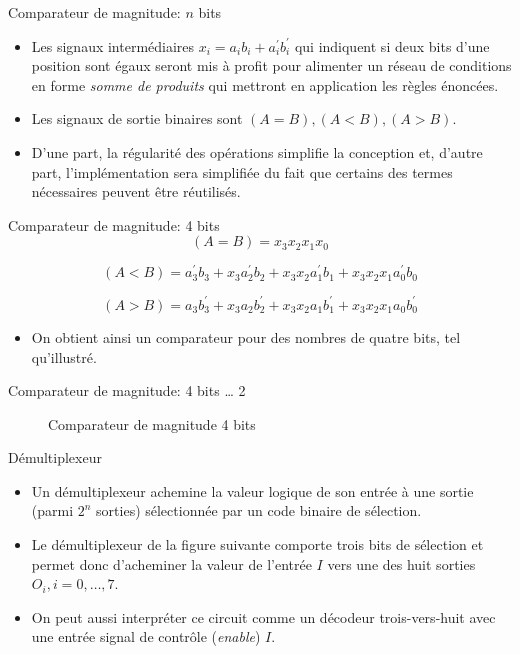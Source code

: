 \documentclass[presentation]{beamer}
\begin{document}
\begin{frame}[label={sec:org6680f65}]{Comparateur de magnitude: \(n\) bits}
\begin{itemize}
\item Les signaux intermédiaires \(x_i = a_i b_i + a_i^\prime b_i^\prime\) qui indiquent si deux bits d'une position sont égaux seront mis à profit pour alimenter un réseau de conditions en forme \emph{somme de produits} qui mettront en application les règles énoncées.

\item Les signaux de sortie binaires sont \((A = B), (A < B), (A > B)\).

\item D'une part, la régularité des opérations simplifie la conception et, d'autre part, l'implémentation sera simplifiée du fait que certains des termes nécessaires peuvent être réutilisés.
\end{itemize}
\end{frame}

\begin{frame}[label={sec:orga9f046d}]{Comparateur de magnitude: 4 bits}
$$ (A = B) = x_3 x_2 x_1 x_0 $$ 

$$ (A < B) = a_3^\prime b_3 + x_3  a_2^\prime b_2  +  x_3 x_2  a_1^\prime b_1 +  x_3 x_2 x_1  a_0^\prime b_0 $$

$$ (A > B) = a_3 b_3^\prime + x_3  a_2 b_2^\prime  +  x_3 x_2  a_1 b_1^\prime +  x_3 x_2 x_1  a_0 b_0^\prime $$

\begin{itemize}
\item On obtient ainsi un comparateur pour des nombres de quatre bits, tel qu'illustré.
\end{itemize}
\end{frame}

\begin{frame}[label={sec:org4d44a9e}]{Comparateur de magnitude: 4 bits \ldots{} 2}
\begin{figure}[htbp]
\centering

\caption{\label{fig:org7107471}Comparateur de magnitude 4 bits}
\end{figure}
\end{frame}

\begin{frame}[label={sec:org780b1fa}]{Démultiplexeur}
\begin{itemize}
\item Un démultiplexeur achemine la valeur logique de son entrée à une sortie (parmi \(2^n\) sorties) sélectionnée par un code binaire de sélection.

\item Le démultiplexeur de la figure suivante comporte trois bits de sélection et permet donc d'acheminer la valeur de l'entrée \(I\) vers une des huit sorties \(O_i, i = 0, \ldots, 7\).

\item On peut aussi interpréter ce circuit comme un décodeur trois-vers-huit avec une entrée signal de contrôle (\emph{enable}) \(I\).
\end{itemize}
\end{frame}
\end{document}
